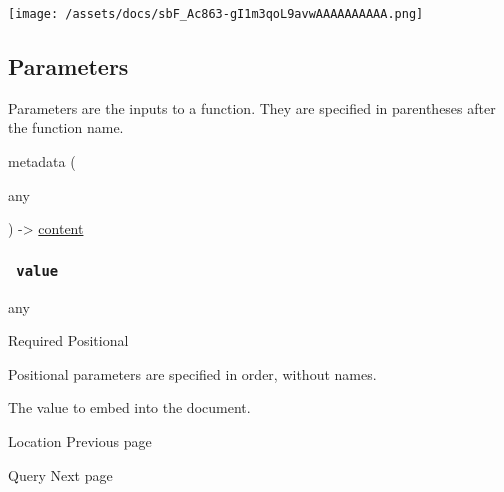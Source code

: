 \texttt{[image: /assets/docs/sbF\_Ac863-gI1m3qoL9avwAAAAAAAAAA.png]}

\subsection{\texorpdfstring{{ Parameters
}}{ Parameters }}\label{parameters}

\label{parameters-tooltip}
Parameters are the inputs to a function. They are specified in
parentheses after the function name.

{ metadata } (

{ { any } }

) -\textgreater{} \href{/docs/reference/foundations/content/}{content}

\subsubsection{\texorpdfstring{\texttt{\ value\ }}{ value }}\label{parameters-value}

{ any }

{Required} {{ Positional }}

\label{parameters-value-positional-tooltip}
Positional parameters are specified in order, without names.

The value to embed into the document.

\href{/docs/reference/introspection/location/}{\pandocbounded{}}

{ Location } { Previous page }

\href{/docs/reference/introspection/query/}{\pandocbounded{}}

{ Query } { Next page }
